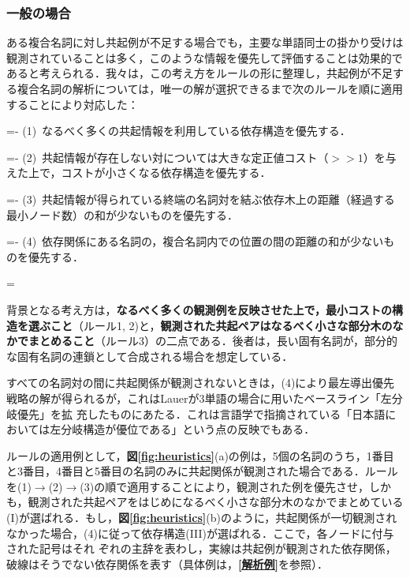 \vspace*{-3mm}
\subsubsection{一般の場合}\label{一般の場合}
ある複合名詞に対し共起例が不足する場合でも，主要な単語同士の掛かり受けは観測されていることは多く，このような情報を優先して評価することは効果的であると考えられる．我々は，この考え方をルールの形に整理し，共起例が不足する複合名詞の解析については，唯一の解が選択できるまで次のルールを順に適用することにより対応した：

\settowidth{\leftskip}{(1)\ }
\settowidth{\parindent}{(1)\ }
\parindent=-\parindent
(1)\ なるべく多くの共起情報を利用している依存構造を優先する．

\settowidth{\leftskip}{(2)\ }
\settowidth{\parindent}{(2)\ }
\parindent=-\parindent
(2)\ 共起情報が存在しない対については大きな定正値コスト（$>>1$）を与えた上で，コストが小さくなる依存構造を優先する．

\settowidth{\leftskip}{(3)\ }
\settowidth{\parindent}{(3)\ }
\parindent=-\parindent
(3)\ 共起情報が得られている終端の名詞対を結ぶ依存木上の距離（経過する最小ノード数）の和が少ないものを優先する．

\settowidth{\leftskip}{(4)\ }
\settowidth{\parindent}{(4)\ }
\parindent=-\parindent
(4)\ 依存関係にある名詞の，複合名詞内での位置の間の距離の和が少ないものを優先する．

\parindent=\originalparindent
\leftskip=0mm

背景となる考え方は，{\bf なるべく多くの観測例を反映させた上で，最小コストの構造を選ぶこと}（ルール1, 2)と，{\bf 観測された共起ペアはなるべく小さな部分木のなかでまとめること}（ルール3）の二点である．後者は，長い固有名詞が，部分的な固有名詞の連鎖として合成される場合を想定している．

すべての名詞対の間に共起関係が観測されないときは，(4)により最左導出優先戦略の解が得られるが，これはLauerが3単語の場合に用いたベースライン「左分岐優先」\cite{Lauer1995}を拡\break
充したものにあたる．これは言語学で指摘されている「日本語においては左分岐構造が優位である」\cite{奥津1978}という点の反映でもある．

ルールの適用例として，{\bf 図\ref{fig:heuristics}}(a)の例は，5個の名詞のうち，1番目と3番目，4番目と5番目の名詞のみに共起関係が観測された場合である．ルールを(1)$\rightarrow$(2)$\rightarrow$(3)の順で適用することにより，観測された例を優先させ，しかも，観測された共起ペアをはじめになるべく小さな部分木のなかでまとめている(I)が選ばれる．もし，{\bf 図\ref{fig:heuristics}}(b)のように，共起関係が一切観測されなかった場合，(4)に従って依存構造(III)が選ばれる．ここで，各ノードに付与された記号はそれ\break
ぞれの主辞を表わし，実線は共起例が観測された依存関係，破線はそうでない依存関係を表す（具体例は，{\bf \ref{解析例}}を参照）．


